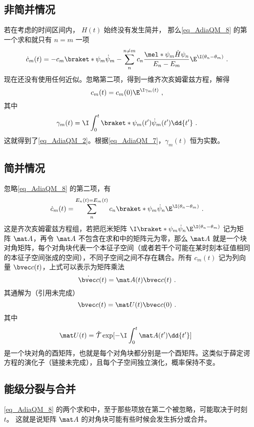 \subsection{非简并情况}
若在考虑的时间区间内， $H(t)$ 始终没有发生简并， 那么\autoref{eq_AdiaQM_8} 的第一个求和就只有 $n=m$ 一项
\begin{equation}
\dot c_m(t) = -c_m \braket*{\psi_m}{\dot\psi_m} - \sum_{n}^{n\ne m} c_n \frac{\mel*{\psi_m}{\dot H}{\psi_n}}{E_n-E_m} \E^{\I(\theta_n-\theta_m)}~.
\end{equation}
现在还没有使用任何近似。忽略第二项，得到一维齐次亥姆霍兹方程，解得
\begin{equation}
c_m(t) = c_m(0)\E^{\I\gamma_m(t)}~,
\end{equation}
其中
\begin{equation}
\gamma_m(t) = \I \int_0^t \braket*{\psi_m(t')}{\dot\psi_m(t')}\dd{t'}~.
\end{equation}
这就得到了\autoref{eq_AdiaQM_2}。根据\autoref{eq_AdiaQM_7}，$\gamma_m(t)$ 恒为实数。

\subsection{简并情况}
忽略\autoref{eq_AdiaQM_8} 的第二项，有
\begin{equation}
\dot c_m(t) = \sum_{n}^{E_n(t)=E_m(t)} c_n \braket*{\psi_m}{\dot\psi_n}\E^{\I(\theta_n-\theta_m)}~.
\end{equation}
这是齐次亥姆霍兹方程组，若把厄米矩阵 $\I\braket*{\psi_m}{\dot\psi_n}\E^{\I(\theta_n-\theta_m)}$ 记为矩阵 $\mat A$，再令 $\mat A$ 不包含在求和中的矩阵元为零，那么 $\mat A$ 就是一个块对角矩阵，每个对角块代表一个本征子空间（或者若干个可能在某时刻本征值相同的本征子空间张成的空间），不同子空间之间不存在耦合。所有 $c_m(t)$ 记为列向量 $\bvec c(t)$，上式可以表示为矩阵乘法
\begin{equation}
\dot{\bvec c}(t) = \mat A(t) \bvec c(t)~.
\end{equation}
其通解为（引用未完成）
\begin{equation}
\bvec c(t) = \mat U(t)\bvec c(0)~.
\end{equation}
其中
\begin{equation}
\mat U(t) = \hat{\mathcal{T}}\exp[-\I \int_0^t \mat A(t') \dd{t'}]~
\end{equation}
是一个块对角的酉矩阵，也就是每个对角块都分别是一个酉矩阵。这类似于薛定谔方程的演化子（链接未完成），且每个子空间独立演化，概率保持不变。


\subsection{能级分裂与合并}
\autoref{eq_AdiaQM_8} 的两个求和中，至于那些项放在第二个被忽略，可能取决于时刻 $t$。 这就是说矩阵 $\mat A$ 的对角块可能有些时候会发生拆分或合并。
